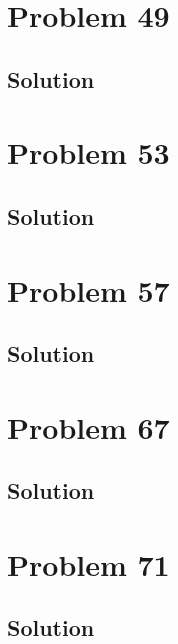 \documentclass[12pt]{article}
\begin{document}
    \section{Problem 49}

        \subsection{Solution}

    \section{Problem 53}

        \subsection{Solution}

    \section{Problem 57}

        \subsection{Solution}

    \section{Problem 67}

        \subsection{Solution}

    \section{Problem 71}

        \subsection{Solution}

    \pagebreak

    \tableofcontents
\end{document}
